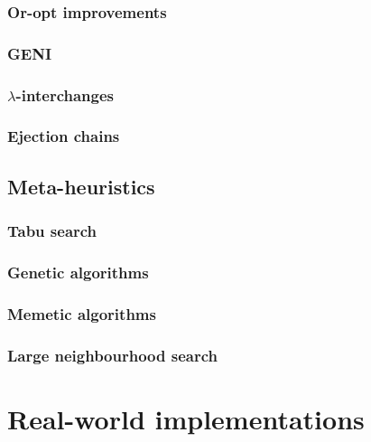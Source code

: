 \subsubsection{Or-opt improvements}

\subsubsection{GENI}

\subsubsection{$\lambda$-interchanges}

\subsubsection{Ejection chains}


\subsection{Meta-heuristics}

\subsubsection{Tabu search}

\subsubsection{Genetic algorithms}

\subsubsection{Memetic algorithms}

\subsubsection{Large neighbourhood search}


\section{Real-world implementations}




